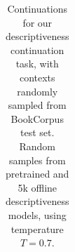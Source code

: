 \begin{table}[t]
\begin{center}
\begin{tabular}{|p{2cm}|p{4cm}|p{4cm}|p{4cm}|}
\end{tabular}
\caption{Continuations for our descriptiveness continuation task, with contexts randomly sampled from BookCorpus test set.  Random samples from pretrained and 5k offline descriptiveness models, using temperature $T=0.7$.}
\label{tab:samples-descriptiveness}
\end{center}
\end{table}
    
